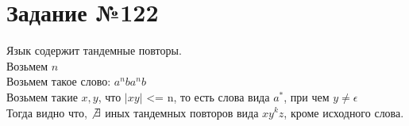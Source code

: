 \documentclass[12pt]{article}
\begin{document}
\section{Задание №122}
Язык содержит тандемные повторы. \\
Возьмем $n$ \\
Возьмем такое слово: $a^{n}ba^{n}b$ \\
Возьмем такие $x, y$, что $|xy|$ <= n, то есть слова вида $a^{*}$, при чем $y \not= \epsilon$ \\
Тогда видно что, $\not\exists$ иных тандемных повторов вида $xy^{k}z$, кроме исходного слова.
\end{document}
